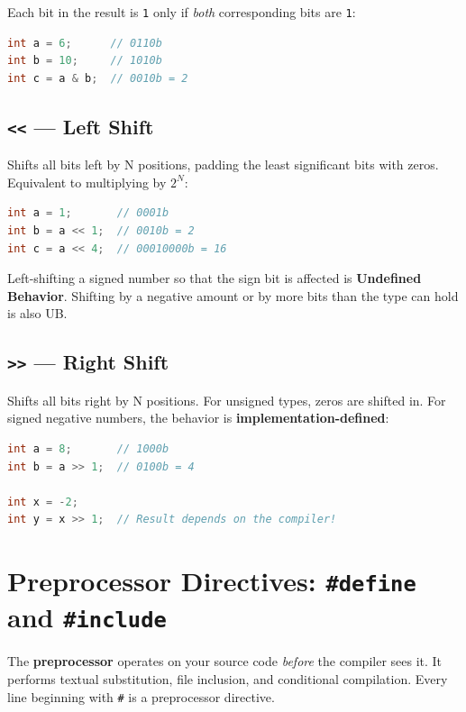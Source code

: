 Each bit in the result is \texttt{1} only if \textit{both} corresponding bits are \texttt{1}:

\begin{lstlisting}[language=C++, caption={Bitwise AND}]
int a = 6;      // 0110b
int b = 10;     // 1010b
int c = a & b;  // 0010b = 2
\end{lstlisting}

\subsection{\texttt{<<} --- Left Shift}

Shifts all bits left by N positions, padding the least significant bits with zeros. Equivalent to multiplying by $2^N$:

\begin{lstlisting}[language=C++, caption={Left shift}]
int a = 1;       // 0001b
int b = a << 1;  // 0010b = 2
int c = a << 4;  // 00010000b = 16
\end{lstlisting}

Left-shifting a signed number so that the sign bit is affected is \textbf{Undefined Behavior}. Shifting by a negative amount or by more bits than the type can hold is also UB.

\subsection{\texttt{>>} --- Right Shift}

Shifts all bits right by N positions. For unsigned types, zeros are shifted in. For signed negative numbers, the behavior is \textbf{implementation-defined}:

\begin{lstlisting}[language=C++, caption={Right shift}]
int a = 8;       // 1000b
int b = a >> 1;  // 0100b = 4

int x = -2;
int y = x >> 1;  // Result depends on the compiler!
\end{lstlisting}

\section{Preprocessor Directives: \texttt{\#define} and \texttt{\#include}}
\label{sec:preprocessor}

The \textbf{preprocessor} operates on your source code \textit{before} the compiler sees it. It performs textual substitution, file inclusion, and conditional compilation. Every line beginning with \texttt{\#} is a preprocessor directive.

